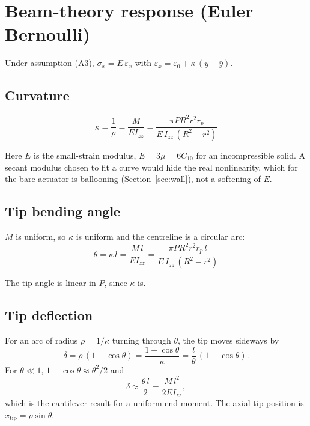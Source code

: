 \documentclass[11pt,a4paper]{article}
\numberwithin{equation}{section}
\newcommand{\Izz}{I_{zz}}
\newcommand{\rp}{r_p}
\begin{document}
\section{Beam-theory response (Euler--Bernoulli)}\label{sec:beam}

Under assumption (A3), $\sigma_x = E\,\varepsilon_x$ with $\varepsilon_x = \varepsilon_0 + \kappa\,(y-\bar y)$.

\subsection{Curvature}
\begin{equation}
\boxed{\;\kappa = \frac{1}{\rho} = \frac{M}{E\Izz} = \frac{\pi P R^2 r^2 \rp}{E\,\Izz\,(R^2-r^2)}\;} \label{eq:kappa}
\end{equation}

Here $E$ is the small-strain modulus, $E = 3\mu = 6C_{10}$ for an incompressible solid. A secant modulus chosen to
fit a curve would hide the real nonlinearity, which for the bare actuator is ballooning (Section~\ref{sec:wall}), not a softening of $E$.

\subsection{Tip bending angle}
$M$ is uniform, so $\kappa$ is uniform and the centreline is a circular arc:
\begin{equation}
\boxed{\;\theta = \kappa\,l = \frac{M\,l}{E\Izz} = \frac{\pi P R^2 r^2 \rp\, l}{E\,\Izz\,(R^2-r^2)}\;} \label{eq:theta}
\end{equation}

The tip angle is linear in $P$, since $\kappa$ is.

\subsection{Tip deflection}
For an arc of radius $\rho=1/\kappa$ turning through $\theta$, the tip moves sideways by
\begin{equation}
\delta = \rho\,(1-\cos\theta) = \frac{1-\cos\theta}{\kappa} = \frac{l}{\theta}\,(1-\cos\theta). \label{eq:delta-arc}
\end{equation}
For $\theta\ll 1$, $1-\cos\theta \approx \theta^2/2$ and
\begin{equation}
\delta \approx \frac{\theta\, l}{2} = \frac{M\,l^2}{2E\Izz}, \label{eq:delta-small}
\end{equation}
which is the cantilever result for a uniform end moment.
The axial tip position is $x_{\text{tip}} = \rho\sin\theta$.
\end{document}
